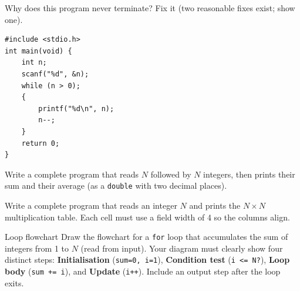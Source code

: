 \documentclass[11pt]{article}
\begin{document}
\begin{bug}
Why does this program never terminate? Fix it (two reasonable fixes exist; show one).
\begin{lstlisting}
#include <stdio.h>
int main(void) {
    int n;
    scanf("%d", &n);
    while (n > 0);
    {
        printf("%d\n", n);
        n--;
    }
    return 0;
}
\end{lstlisting}
\end{bug}

\begin{writecode}
Write a complete program that reads $N$ followed by $N$ integers, then prints
their sum and their average (as a \texttt{double} with two decimal places).
\end{writecode}

\begin{writecode}
Write a complete program that reads an integer $N$ and prints the $N\times N$
multiplication table. Each cell must use a field width of 4 so the columns align.
\end{writecode}

\begin{drawex}{Loop flowchart}
Draw the flowchart for a \texttt{for} loop that accumulates the sum of integers
from 1 to $N$ (read from input).
Your diagram must clearly show four distinct steps:
\textbf{Initialisation} (\texttt{sum=0, i=1}),
\textbf{Condition test} (\texttt{i <= N?}),
\textbf{Loop body} (\texttt{sum += i}),
and \textbf{Update} (\texttt{i++}).
Include an output step after the loop exits.
\end{drawex}
\end{document}

